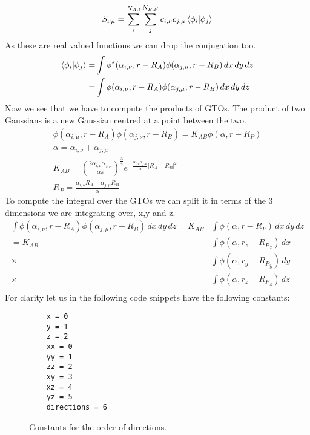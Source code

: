 \begin{equation}
    S_{\nu\mu} =\sum_i^{N_{A,l}}\sum_j^{N_{B,l'}}c_{i,\nu}c_{j,\mu} \braket{\phi_i|\phi_j}
\end{equation}
As these are real valued functions we can drop the conjugation too.
\begin{equation}
    \begin{split}
        \braket{\phi_i|\phi_j} = &\int \phi^*(\alpha_{i,\nu},r-R_A)\phi(\alpha_{j,\mu},r-R_B)\,dx\,dy\,dz\\
        =&\int \phi(\alpha_{i,\nu},r-R_A)\phi(\alpha_{j,\mu},r-R_B)\,dx\,dy\,dz\\
    \end{split}
\end{equation}
Now we see that we have to compute the products of GTOs. The product of two Gaussians is a new Gaussian centred at a point between the two.
\begin{gather}
    \phi(\alpha_{i,\mu},r-R_A)\phi(\alpha_{j,\nu},r-R_B) = K_{AB}\phi(\alpha,r-R_P)\\
    \alpha = \alpha_{i,\nu}+\alpha_{j,\mu}\\
    K_{AB} = \left(\frac{2\alpha_{i,\nu}\alpha_{j,\mu}}{\alpha\pi}\right)^\frac{3}{4}e^{-\frac{\alpha_{i,\nu}\alpha_{j,\mu}}{\alpha}|R_A-R_B|^2}\\
    R_P = \frac{\alpha_{i,\nu}R_A+\alpha_{j,\mu}R_B}{\alpha}
\end{gather}
To compute the integral over the GTOs we can split it in terms of the 3 dimensions we are integrating over, x,y and z.
\begin{equation}
    \begin{split}
        \int \phi(\alpha_{i,\nu},r-R_A)\phi(\alpha_{j,\mu},r-R_B)\,dx\,dy\,dz=K_{AB}&\int \phi(\alpha,r-R_P)\,dx\,dy\,dz\\
        =K_{AB}&\int \phi(\alpha,r_z-{R_P}_z)\,dx\\
            \times&\int \phi(\alpha,r_y-{R_P}_y)\,dy\\
            \times&\int \phi(\alpha,r_z-{R_P}_z)\,dz\\
    \end{split}
\end{equation}
For clarity let us in the following code snippets have the following constants:
\begin{figure}[H]
\begin{verbatim}
    x = 0
    y = 1
    z = 2
    xx = 0
    yy = 1
    zz = 2
    xy = 3
    xz = 4
    yz = 5
    directions = 6
\end{verbatim}
\caption{Constants for the order of directions.}
\end{figure}

